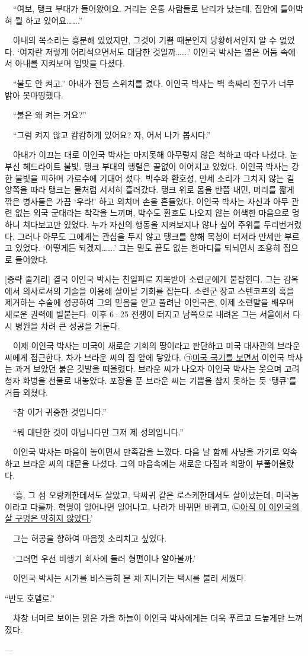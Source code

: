 \documentclass[fs9,seriesRus]{korfarm-base}
\begin{document}
{　“여보, 탱크 부대가 들어왔어요. 거리는 온통 사람들로 난리가 났는데, 집안에 틀어박혀 뭘 하고 있어요…….”

　아내의 목소리는 흥분해 있었지만, 그것이 기쁨 때문인지 당황해서인지 알 수 없었다. ‘여자란 저렇게 어리석으면서도 대담한 것일까…….’ 이인국 박사는 엷은 어둠 속에서 아내를 지켜보며 입맛을 다셨다.

　“불도 안 켜고.” 아내가 전등 스위치를 켰다. 이인국 박사는 백 촉짜리 전구가 너무 밝아 못마땅했다.

　“불은 왜 켜는 거요?”

　“그럼 켜지 않고 캄캄하게 있어요? 자, 어서 나가 봅시다.”

　아내가 이끄는 대로 이인국 박사는 마지못해 아무렇지 않은 척하고 따라 나섰다. 눈부신 헤드라이트 불빛. 탱크 부대의 행렬은 끝없이 이어지고 있었다. 이인국 박사는 강한 불빛을 피하며 가로수에 기대어 섰다. 박수와 환호성, 만세 소리가 그치지 않는 길 양쪽을 따라 탱크는 물처럼 서서히 흘러갔다. 탱크 위로 몸을 반쯤 내민, 머리를 짧게 깎은 병사들은 가끔 ‘우라!’ 하고 외치며 손을 흔들었다. 이인국 박사는 자신과 아무 관련 없는 외국 군대라는 착각을 느끼며, 박수도 환호도 나오지 않는 어색한 마음으로 멍하니 쳐다보고만 있었다. 누가 자신의 행동을 지켜보지나 않나 싶어 주위를 두리번거렸다. 그러나 아무도 그에게는 관심을 두지 않고 탱크를 향해 목청이 터져라 만세만 부르고 있었다. ‘어떻게든 되겠지…….’ 그는 밑도 끝도 없는 한마디를 되뇌면서 조용히 집으로 들어왔다.

[중략 줄거리] 결국 이인국 박사는 친일파로 지목받아 소련군에게 붙잡힌다. 그는 감옥에서 의사로서의 기술을 이용해 살아날 기회를 잡는다. 소련군 장교 스텐코프의 혹을 제거하는 수술에 성공하여 그의 믿음을 얻고 풀려난 이인국은, 이제 소련말을 배우며 새로운 권력에 빌붙는다. 이후 6·25 전쟁이 터지고 남쪽으로 내려온 그는 서울에서 다시 병원을 차려 큰 성공을 거둔다.

　이제 이인국 박사는 미국이 새로운 기회의 땅이라고 판단하고 미국 대사관의 브라운 씨에게 접근한다. 차가 브라운 씨의 집 앞에 닿았다. ㉠\uline{미국 국기를 보면서} 이인국 박사는 과거 보았던 붉은 깃발을 떠올렸다. 브라운 씨가 나오자 이인국 박사는 웃으며 고려청자 화병을 선물로 내놓았다. 포장을 푼 브라운 씨는 기쁨을 참지 못하는 듯 ‘탱큐’를 거듭 외쳤다.

　“참 이거 귀중한 것입니다.”

　“뭐 대단한 것이 아닙니다만 그저 제 성의입니다.”

　이인국 박사는 마음이 놓이면서 만족감을 느꼈다. 다음 날 함께 사냥을 가기로 약속하고 브라운 씨의 대문을 나섰다. 그의 마음속에는 새로운 다짐과 희망이 부풀어올랐다.

　‘흥, 그 섬 오랑캐한테서도 살았고, 닥싸귀 같은 로스케한테서도 살아났는데, 미국놈이라고 다를까. 혁명이 일어나면 일어나고, 나라가 바뀌면 바뀌고, ㉡\uline{아직 이 이인국의 살 구멍은 막히지 않았다.}’

　그는 허공을 향하여 마음껏 소리치고 싶었다.

　‘그러면 우선 비행기 회사에 들러 형편이나 알아볼까.’

　이인국 박사는 시가를 비스듬히 문 채 지나가는 택시를 불러 세웠다.

“반도 호텔로.”

　차창 너머로 보이는 맑은 가을 하늘이 이인국 박사에게는 더욱 푸르고 드높게만 느껴졌다.

---
}
\end{document}
